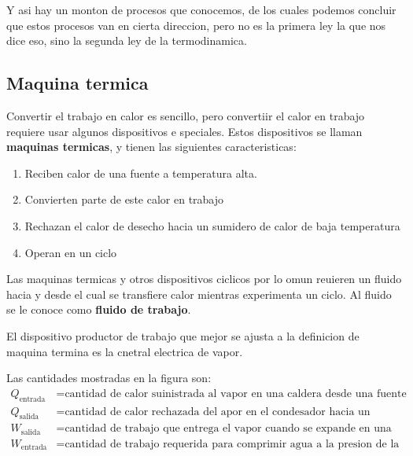 \documentclass[12pt]{article}
\begin{document}
  Y asi hay un monton de procesos que conocemos, de los cuales podemos concluir que estos procesos van en cierta direccion, pero no es la primera ley la que nos dice eso, sino la segunda ley de la termodinamica.

  \subsection{Maquina termica}
  Convertir el trabajo en calor es sencillo, pero convertiir el calor en trabajo requiere usar algunos dispositivos e speciales. Estos dispositivos se llaman \textbf{maquinas termicas}, y tienen las siguientes caracteristicas:
  \begin{enumerate}[1.]
    \item Reciben calor de una fuente a temperatura alta.

    \item Convierten parte de este calor en trabajo

    \item Rechazan el calor de desecho hacia un sumidero de calor de baja temperatura

    \item Operan en un ciclo
  \end{enumerate}

  Las maquinas termicas y otros dispositivos ciclicos por lo omun reuieren un fluido hacia y desde el cual se transfiere calor mientras experimenta un ciclo. Al fluido se le conoce como \textbf{fluido de trabajo}.

  El dispositivo productor de trabajo que mejor se ajusta a la definicion de maquina termina es la cnetral electrica de vapor.

  Las cantidades mostradas en la figura son:
  \begin{align*}
    Q_{\text{entrada}} &= \text{cantidad de calor suinistrada al vapor en una caldera desde una fuente de temperatura alta (horno).}\\
    Q_{\text{salida}} &= \text{cantidad de calor rechazada del apor en el condesador hacia un sumidero de temperatura baja (atmosfera, rio, etc)}\\
    W_{\text{salida}} &= \text{cantidad de trabajo que entrega el vapor cuando se expande en una turbina}\\
    W_{\text{entrada}} &= \text{cantidad de trabajo requerida para comprimir agua a la presion de la caldera}
  \end{align*}
\end{document}
